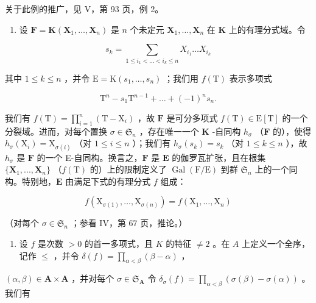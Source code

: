 关于此例的推广，见 V，第 93 页，例 2。

\begin{enumerate}
\def\labelenumi{\arabic{enumi})}
\setcounter{enumi}{4}
\tightlist
\item
  设 \(\mathbf{F} = \mathbf{K}(\mathbf{X}_1, \ldots, \mathbf{X}_n)\) 是 \(n\) 个未定元 \(\mathbf{X}_1, \ldots, \mathbf{X}_n\) 在 \(\mathbf{K}\) 上的有理分式域。令
\end{enumerate}

\[
s _ {k} = \sum_ {1 \leqslant i _ {1} <   \dots <   i _ {k} \leqslant n} X _ {i _ {1}} \dots X _ {i _ {k}}
\]

其中 \(1 \leqslant k \leqslant n\) ，并令 \(\mathrm{E} = \mathrm{K}(s_1, \ldots, s_n)\) ；我们用 \(f(\mathrm{T})\) 表示多项式

\[
\mathrm{T} ^ {n} - s _ {1} \mathrm{T} ^ {n - 1} + \dots + (- 1) ^ {n} s _ {n}.
\]

我们有 \(f(\mathrm{T}) = \prod_{i=1}^{n} (\mathrm{T} - \mathrm{X}_i)\) ，故 \(\mathbf{F}\) 是可分多项式 \(f(\mathrm{T}) \in \mathrm{E}[\mathrm{T}]\) 的一个分裂域。进而，对每个置换 \(\sigma \in \mathfrak{S}_n\) ，存在唯一一个 \(\mathbf{K}\) -自同构 \(h_\sigma\) （\(\mathbf{F}\) 的），使得 \(h_\sigma(\mathrm{X}_i) = \mathrm{X}_{\sigma(i)}\) （对 \(1 \leqslant i \leqslant n\) ）；我们有 \(h_\sigma(s_k) = s_k\) （对 \(1 \leqslant k \leqslant n\) ），故 \(h_\sigma\) 是 \(\mathbf{F}\) 的一个 E-自同构。换言之，\(\mathbf{F}\) 是 \(\mathbf{E}\) 的伽罗瓦扩张，且在根集 \(\{\mathbf{X}_1, ..., \mathbf{X}_n\}\) （\(f(\mathrm{T})\) 的）上的限制定义了 \(\operatorname{Gal}(\mathrm{F}/\mathrm{E})\) 到群 \(\mathfrak{S}_n\) 上的一个同构。特别地，\(\mathbf{E}\) 由满足下式的有理分式 \(f\) 组成：

\[
f \left(\mathrm{X} _ {\sigma (1)}, \dots , \mathrm{X} _ {\sigma (n)}\right) = f \left(\mathrm{X} _ {1}, \dots , \mathrm{X} _ {n}\right)
\]

（对每个 \(\sigma \in \mathfrak{S}_n\) ；参看 IV，第 67 页，推论。）

\begin{enumerate}
\def\labelenumi{\arabic{enumi})}
\setcounter{enumi}{5}
\tightlist
\item
  设 \(f\) 是次数 \(> 0\) 的首一多项式，且 \(K\) 的特征 \(\neq 2\) 。在 \(A\) 上定义一个全序，记作 \(\leqslant\) ，并令 \(\delta(f) = \prod_{\alpha < \beta} (\beta - \alpha)\) ，
\end{enumerate}

\((\alpha, \beta) \in \mathbf{A} \times \mathbf{A}\) ，并对每个 \(\sigma \in \mathfrak{S}_{\mathbf{A}}\) 令 \(\delta_{\sigma}(f) = \prod_{\alpha < \beta} (\sigma(\beta) - \sigma(\alpha))\) 。我们有

